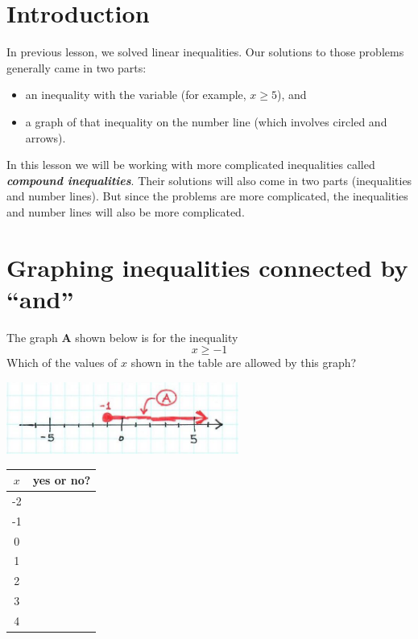 

\section*{Introduction}

In previous lesson, we solved linear inequalities. 
Our solutions to those problems generally came in two parts:
\begin{itemize}
    \item an inequality with the variable (for example, $x \geq 5$), and
    \item a graph of that inequality on the number line (which involves circled and arrows).
\end{itemize}



In this lesson we will be working with more complicated inequalities called
{\bfseries\itshape compound inequalities}.
Their solutions will also come in two parts (inequalities and number lines).
But since the problems are more complicated, the inequalities and number lines will also be more complicated.



\section*{Graphing inequalities connected by ``and''}

\begin{myExample}{
    The graph {\sffamily\bfseries A} shown below is for the inequality 
    \[x \geq -1\]
    Which of the values of $x$ shown in the table are allowed by this graph?
}
    \begin{center}
        \includegraphics[width=3in]{and-1.jpg}
        
        \Large
        \begin{tabular}{c|c}
            $x$ & yes or no? \\
            \toprule
            -2 & \\
            -1& \\
            0& \\
            1& \\
            2& \\
            3& \\
            4& \\
            \bottomrule
        \end{tabular}
    \end{center}
\end{myExample}


